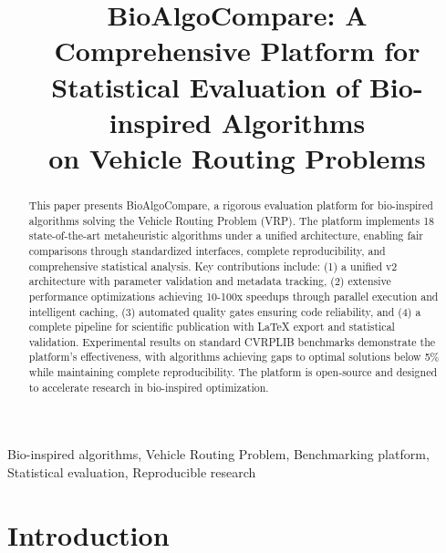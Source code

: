 \documentclass[conference]{IEEEtran}
\begin{document}
\title{BioAlgoCompare: A Comprehensive Platform for\\Statistical Evaluation of Bio-inspired Algorithms\\on Vehicle Routing Problems}

\author{
}

\maketitle

\begin{abstract}
This paper presents BioAlgoCompare, a rigorous evaluation platform for bio-inspired algorithms solving the Vehicle Routing Problem (VRP). The platform implements 18 state-of-the-art metaheuristic algorithms under a unified architecture, enabling fair comparisons through standardized interfaces, complete reproducibility, and comprehensive statistical analysis. Key contributions include: (1) a unified v2 architecture with parameter validation and metadata tracking, (2) extensive performance optimizations achieving 10-100x speedups through parallel execution and intelligent caching, (3) automated quality gates ensuring code reliability, and (4) a complete pipeline for scientific publication with LaTeX export and statistical validation. Experimental results on standard CVRPLIB benchmarks demonstrate the platform's effectiveness, with algorithms achieving gaps to optimal solutions below 5\% while maintaining complete reproducibility. The platform is open-source and designed to accelerate research in bio-inspired optimization.
\end{abstract}

\begin{IEEEkeywords}
Bio-inspired algorithms, Vehicle Routing Problem, Benchmarking platform, Statistical evaluation, Reproducible research
\end{IEEEkeywords}

\section{Introduction}
\label{sec:introduction}
\end{document}
